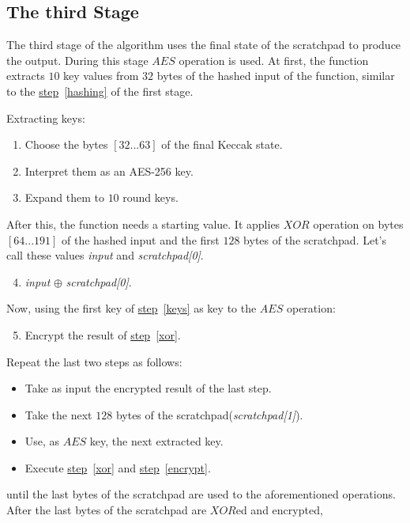 \subsection{The third Stage}
The third stage of the algorithm uses the final state of the scratchpad to produce the output. During this stage $AES$ operation is used. At first, the function extracts $10$ key values from $32$ bytes of the hashed input of the function, similar to the \hyperref[hashing]{step}~\ref{hashing} of the first stage.

\noindent Extracting keys:
\begin{enumerate}
  \item Choose the bytes $[32...63]$ of the final Keccak state.
  \item Interpret them as an AES-256 key.
  \item \label{keys} Expand them to $10$ round keys.
\end{enumerate}
After this, the function needs a starting value. It applies $XOR$ operation on bytes $[64...191]$ of the hashed input and the first $128$ bytes of the scratchpad. Let's call these values \emph{input} and \emph{scratchpad[0]}.

\begin{enumerate}
  \setcounter{enumi}{3}
  \item \label{xor} \emph{input} $\oplus$ \emph{scratchpad[0]}.
\end{enumerate}
Now, using the first key of \hyperref[keys]{step}~\ref{keys} as key to the $AES$ operation:

\begin{enumerate}
  \setcounter{enumi}{4}
  \item \label{encrypt} Encrypt the result of \hyperref[xor]{step}~\ref{xor}.
\end{enumerate}
Repeat the last two steps as follows:

\begin{itemize}
  \item Take as input the encrypted result of the last step.
  \item Take the next $128$ bytes of the scratchpad(\emph{scratchpad[1]}).
  \item Use, as $AES$ key, the next extracted key.
  \item Execute \hyperref[xor]{step}~\ref{xor} and \hyperref[encrypt]{step}~\ref{encrypt}.
\end{itemize}
until the last bytes of the scratchpad are used to the aforementioned operations. After the last bytes of the scratchpad are $XOR$ed and encrypted,

